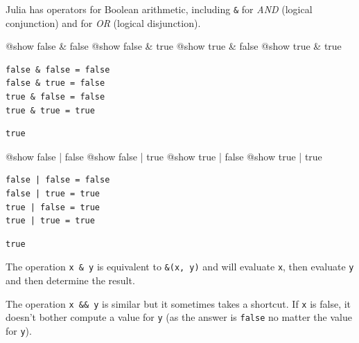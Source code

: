 \documentclass[
]{article}
\newenvironment{Shaded}{\begin{snugshade}}{\end{snugshade}}
\newcommand{\ConstantTok}[1]{\textcolor[rgb]{0.56,0.35,0.01}{#1}}
\newcommand{\OperatorTok}[1]{\textcolor[rgb]{0.37,0.37,0.37}{#1}}
\newcommand{\PreprocessorTok}[1]{\textcolor[rgb]{0.68,0.00,0.00}{#1}}
\begin{document}
Julia has operators for Boolean arithmetic, including \texttt{\&} for
\emph{AND} (logical conjunction) and \texttt{\textbar{}} for \emph{OR}
(logical disjunction).

\begin{Shaded}
\begin{Highlighting}[]
\PreprocessorTok{@show} \ConstantTok{false} \OperatorTok{\&} \ConstantTok{false}
\PreprocessorTok{@show} \ConstantTok{false} \OperatorTok{\&} \ConstantTok{true}
\PreprocessorTok{@show} \ConstantTok{true} \OperatorTok{\&} \ConstantTok{false}
\PreprocessorTok{@show} \ConstantTok{true} \OperatorTok{\&} \ConstantTok{true}
\end{Highlighting}
\end{Shaded}

\begin{verbatim}
false & false = false
false & true = false
true & false = false
true & true = true
\end{verbatim}

\begin{verbatim}
true
\end{verbatim}

\begin{Shaded}
\begin{Highlighting}[]
\PreprocessorTok{@show} \ConstantTok{false} \OperatorTok{|} \ConstantTok{false}
\PreprocessorTok{@show} \ConstantTok{false} \OperatorTok{|} \ConstantTok{true}
\PreprocessorTok{@show} \ConstantTok{true} \OperatorTok{|} \ConstantTok{false}
\PreprocessorTok{@show} \ConstantTok{true} \OperatorTok{|} \ConstantTok{true}
\end{Highlighting}
\end{Shaded}

\begin{verbatim}
false | false = false
false | true = true
true | false = true
true | true = true
\end{verbatim}

\begin{verbatim}
true
\end{verbatim}

The operation \texttt{x\ \&\ y} is equivalent to \texttt{\&(x,\ y)} and
will evaluate \texttt{x}, then evaluate \texttt{y} and then determine
the result.

The operation \texttt{x\ \&\&\ y} is similar but it sometimes takes a
shortcut. If \texttt{x} is false, it doesn't bother compute a value for
\texttt{y} (as the answer is \texttt{false} no matter the value for
\texttt{y}).
\end{document}
